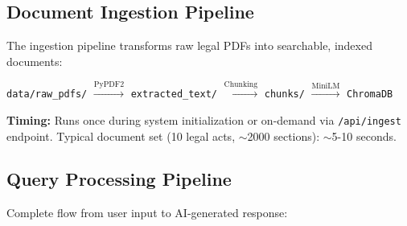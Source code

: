 \documentclass[12pt,a4paper]{article}
\begin{document}
\subsection{Document Ingestion Pipeline}

The ingestion pipeline transforms raw legal PDFs into searchable, indexed documents:

\begin{center}
\texttt{data/raw\_pdfs/} $\xrightarrow{\text{PyPDF2}}$ \texttt{extracted\_text/} $\xrightarrow{\text{Chunking}}$ \texttt{chunks/} $\xrightarrow{\text{MiniLM}}$ \texttt{ChromaDB}
\end{center}

\textbf{Timing:} Runs once during system initialization or on-demand via \texttt{/api/ingest} endpoint. Typical document set (10 legal acts, $\sim$2000 sections): $\sim$5-10 seconds.

\subsection{Query Processing Pipeline}

Complete flow from user input to AI-generated response:
\end{document}
